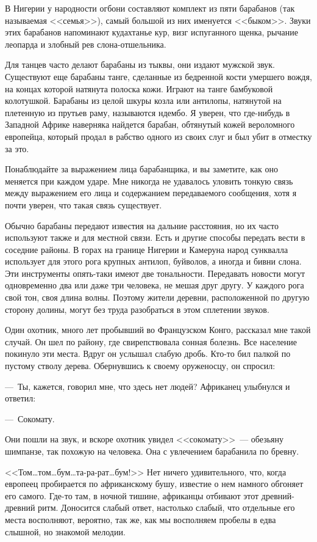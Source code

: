 \documentclass[12pt,a4paper,twoside,openany,svgnames]{memoir}
\begin{document}
В Нигерии у народности огбони составляют комплект из пяти барабанов (так называемая <<семья>>), самый большой из них именуется <<быком>>. Звуки этих барабанов напоминают кудахтанье кур, визг испуганного щенка, рычание леопарда и злобный рев слона-отшельника.

Для танцев часто делают барабаны из тыквы, они издают мужской звук. Существуют еще барабаны танге, сделанные из бедренной кости умершего вождя, на концах которой натянута полоска кожи. Играют на танге бамбуковой колотушкой. Барабаны из целой шкуры козла или антилопы, натянутой на плетенную из прутьев раму, называются ндембо. Я уверен, что где-нибудь в Западной Африке наверняка найдется барабан, обтянутый кожей вероломного европейца, который продал в рабство одного из своих слуг и был убит в отместку за это.

Понаблюдайте за выражением лица барабанщика, и вы заметите, как оно меняется при каждом ударе. Мне никогда не удавалось уловить тонкую связь между выражением его лица и содержанием передаваемого сообщения, хотя я почти уверен, что такая связь существует.

Обычно барабаны передают известия на дальние расстояния, но их часто используют также и для местной связи. Есть и другие способы передать вести в соседние районы. В горах на границе Нигерии и Камеруна народ сунквалла использует для этого рога крупных антилоп, буйволов, а иногда и бивни слона. Эти инструменты опять-таки имеют две тональности. Передавать новости могут одновременно два или даже три человека, не мешая друг другу. У каждого рога свой тон, своя длина волны. Поэтому жители деревни, расположенной по другую сторону долины, могут без труда разобраться в этом сплетении звуков.

Один охотник, много лет пробывший во Французском Конго, рассказал мне такой случай. Он шел по району, где свирепствовала сонная болезнь. Все население покинуло эти места. Вдруг он услышал слабую дробь. Кто-то бил палкой по пустому стволу дерева. Обернувшись к своему оруженосцу, он спросил:

---~Ты, кажется, говорил мне, что здесь нет людей? Африканец улыбнулся и ответил:

---~Сокомату.

Они пошли на звук, и вскоре охотник увидел <<сокомату>>~--- обезьяну шимпанзе, так похожую на человека. Она с увлечением барабанила по бревну.

<<Том\ldots том\ldots бум\ldots та-ра-рат\ldots бум!>> Нет ничего удивительного, что, когда европеец пробирается по африканскому бушу, известие о нем намного обгоняет его самого. Где-то там, в ночной тишине, африканцы отбивают этот древний-древний ритм. Доносится слабый ответ, настолько слабый, что отдельные его места восполняют, вероятно, так же, как мы восполняем пробелы в едва слышной, но знакомой мелодии.
\end{document}
